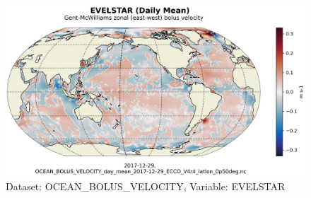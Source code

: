 \begin{figure}[H]
\centering
\includegraphics[scale=0.55]{../images/plots/latlon_plots/Gent-McWilliams_Ocean_Bolus_Velocity/EVELSTAR.png}
\caption{Dataset: OCEAN\_BOLUS\_VELOCITY, Variable: EVELSTAR}
\label{tab:table-OCEAN_BOLUS_VELOCITY_EVELSTAR-Plot}
\end{figure}
\pagebreak
